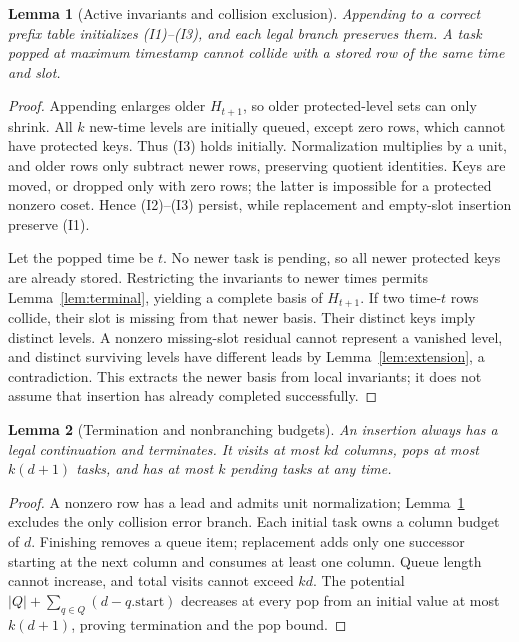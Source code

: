 \documentclass[11pt,a4paper]{article}
\theoremstyle{definition}
\theoremstyle{plain}
\newtheorem{lemma}{Lemma}
\begin{document}
\begin{lemma}[Active invariants and collision exclusion]\label{lem:operational}
Appending to a correct prefix table initializes (I1)--(I3), and each legal branch preserves them.
A task popped at maximum timestamp cannot collide with a stored row of the same time and slot.
\end{lemma}
\begin{proof}
Appending enlarges older $H_{t+1}$, so older protected-level sets can only shrink. All $k$ new-time
levels are initially queued, except zero rows, which cannot have protected keys. Thus (I3) holds
initially. Normalization multiplies by a unit, and older rows only subtract newer rows, preserving
quotient identities. Keys are moved, or dropped only with zero rows; the latter is impossible for
a protected nonzero coset. Hence (I2)--(I3) persist, while replacement and empty-slot insertion
preserve (I1).

Let the popped time be $t$. No newer task is pending, so all newer protected keys are already
stored. Restricting the invariants to newer times permits Lemma~\ref{lem:terminal}, yielding a
complete basis of $H_{t+1}$. If two time-$t$ rows collide, their slot is missing from that newer
basis. Their distinct keys imply distinct levels. A nonzero missing-slot residual cannot represent
a vanished level, and distinct surviving levels have different leads by
Lemma~\ref{lem:extension}, a contradiction. This extracts the newer basis from local invariants;
it does not assume that insertion has already completed successfully.
\end{proof}

\begin{lemma}[Termination and nonbranching budgets]\label{lem:budget}
An insertion always has a legal continuation and terminates. It visits at most $kd$ columns,
pops at most $k(d+1)$ tasks, and has at most $k$ pending tasks at any time.
\end{lemma}
\begin{proof}
A nonzero row has a lead and admits unit normalization; Lemma~\ref{lem:operational} excludes the
only collision error branch. Each initial task owns a column budget of $d$. Finishing removes a
queue item; replacement adds only one successor starting at the next column and consumes at least
one column. Queue length cannot increase, and total visits cannot exceed $kd$. The potential
$|Q|+\sum_{q\in Q}(d-q.\mathrm{start})$ decreases at every pop from an initial value at most
$k(d+1)$, proving termination and the pop bound.
\end{proof}
\end{document}
